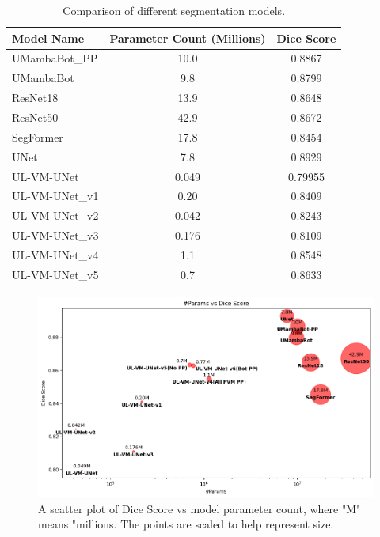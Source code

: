\documentclass[conference]{IEEEtran}
\begin{document}
\begin{table}[ht]
    \centering
    \begin{tabular}{|l|c|c|}
        \hline
        \textbf{Model Name} & \textbf{Parameter Count (Millions)} & \textbf{Dice Score} \\
        \hline
        UMambaBot\_PP       & 10.0                                & 0.8867              \\
        UMambaBot           & 9.8                                 & 0.8799              \\
        ResNet18            & 13.9                                & 0.8648              \\
        ResNet50            & 42.9                                & 0.8672              \\
        SegFormer           & 17.8                                & 0.8454              \\
        UNet                & 7.8                                 & 0.8929              \\
        UL-VM-UNet          & 0.049                               & 0.79955             \\
        UL-VM-UNet\_v1      & 0.20                                & 0.8409              \\
        UL-VM-UNet\_v2      & 0.042                               & 0.8243              \\
        UL-VM-UNet\_v3      & 0.176                               & 0.8109              \\
        UL-VM-UNet\_v4      & 1.1                                 & 0.8548              \\
        UL-VM-UNet\_v5      & 0.7                                 & 0.8633              \\
        \hline
    \end{tabular}
    \caption{Comparison of different segmentation models.}
    \label{tab:model_comparison}
\end{table}

\begin{figure}[!t]
    \centering
    \includegraphics[width=\columnwidth]{imgs/balls.png}
    \caption{A scatter plot of Dice Score vs model parameter count, where "M" means "millions. The points are scaled to help represent size.}
    \label{fig:balls}
\end{figure}
\end{document}
